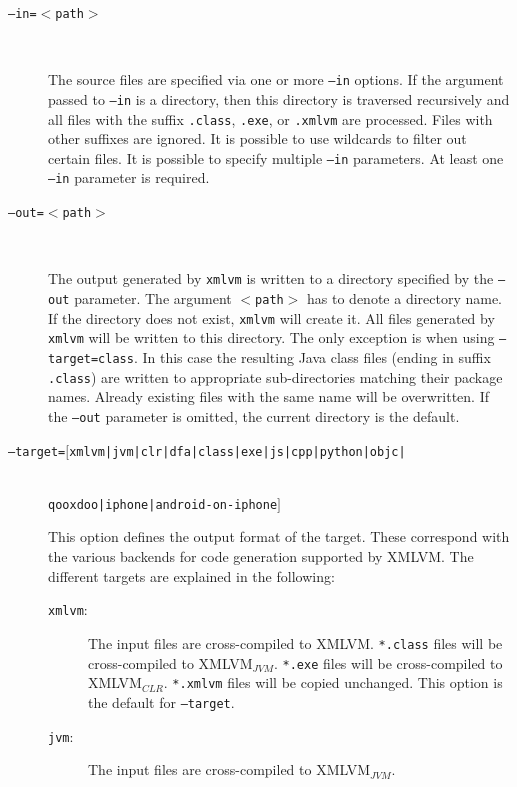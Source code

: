 \documentclass[11pt]{book}
\newcommand{\xmlvm}{\texttt{xmlvm} }
\begin{document}
\begin{description}

\item[\texttt{--in=$<$path$>$}] $ $

  The source files are specified via one or more \texttt{--in}
  options. If the argument passed to \texttt{--in} is a directory,
  then this directory is traversed recursively and all files with the
  suffix \texttt{.class}, \texttt{.exe}, or \texttt{.xmlvm} are
  processed. Files with other suffixes are ignored. It is possible to
  use wildcards to filter out certain files. It is possible to specify
  multiple \texttt{--in} parameters. At least one \texttt{--in}
  parameter is required.

\item[\texttt{--out=$<$path$>$}] $ $

  The output generated by \xmlvm is written to a directory specified
  by the \texttt{--out} parameter.  The argument \texttt{$<$path$>$}
  has to denote a directory name. If the directory does not exist,
  \xmlvm will create it. All files generated by \xmlvm will be written
  to this directory. The only exception is when using
  \texttt{--target=class}.  In this case the resulting Java class
  files (ending in suffix \texttt{.class}) are written to appropriate
  sub-directories matching their package names. Already existing files
  with the same name will be overwritten. If the \texttt{--out}
  parameter is omitted, the current directory is the default.

\item[\texttt{--target=$[$xmlvm|jvm|clr|dfa|class|exe|js|cpp|python|objc|}]
  $ $\\
  \texttt{qooxdoo|iphone|android-on-iphone$]$}
  $ $

  This option defines the output format of the target. These
  correspond with the various backends for code generation supported
  by XMLVM. The different targets are explained in the following:

\begin{description}
\item[\texttt{xmlvm}:] The input files are cross-compiled to XMLVM.
  \texttt{*.class} files will be cross-compiled to XMLVM$_{JVM}$.
  \texttt{*.exe} files will be cross-compiled to XMLVM$_{CLR}$.
  \texttt{*.xmlvm} files will be copied unchanged. This option is the
  default for \texttt{--target}.

\item[\texttt{jvm}:] The input files are cross-compiled to
  XMLVM$_{JVM}$.


\end{description}
\end{description}
\end{document}
